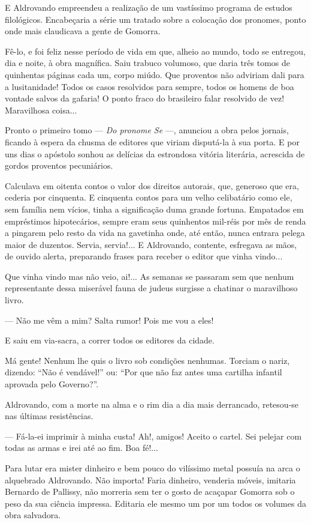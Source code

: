 E Aldrovando empreendeu a realização de um vastíssimo programa de
estudos filológicos. Encabeçaria a série um tratado sobre a colocação
dos pronomes, ponto onde mais claudicava a gente de Gomorra.

Fê-lo, e foi feliz nesse período de vida em que, alheio ao mundo, todo
se entregou, dia e noite, à obra magnífica. Saiu trabuco volumoso, que
daria três tomos de quinhentas páginas cada um, corpo miúdo. Que
proventos não adviriam dali para a lusitanidade! Todos os casos
resolvidos para sempre, todos os homens de boa vontade salvos da
gafaria! O ponto fraco do brasileiro falar resolvido de vez! Maravilhosa
coisa...

Pronto o primeiro tomo --- \emph{Do pronome Se} ---, anunciou a obra
pelos jornais, ficando à espera da chusma de editores que viriam
disputá-la à sua porta. E por uns dias o apóstolo sonhou as delícias da
estrondosa vitória literária, acrescida de gordos proventos pecuniários.

Calculava em oitenta contos o valor dos direitos autorais, que, generoso
que era, cederia por cinquenta. E cinquenta contos para um velho
celibatário como ele, sem família nem vícios, tinha a significação duma
grande fortuna. Empatados em empréstimos hipotecários, sempre eram seus
quinhentos mil-réis por mês de renda a pingarem pelo resto da vida na
gavetinha onde, até então, nunca entrara pelega maior de duzentos.
Servia, servia!... E Aldrovando, contente, esfregava as mãos, de ouvido
alerta, preparando frases para receber o editor que vinha vindo...

Que vinha vindo mas não veio, ai!... As semanas se passaram sem que
nenhum representante dessa miserável fauna de judeus surgisse a chatinar
o maravilhoso livro.

--- Não me vêm a mim? Salta rumor! Pois me vou a eles!

E saiu em via-sacra, a correr todos os editores da cidade.

Má gente! Nenhum lhe quis o livro sob condições nenhumas. Torciam o
nariz, dizendo: ``Não é vendável!'' ou: ``Por que não faz antes uma
cartilha infantil aprovada pelo Governo?''.

Aldrovando, com a morte na alma e o rim dia a dia mais derrancado,
retesou-se nas últimas resistências.

--- Fá-la-ei imprimir à minha custa! Ah!, amigos! Aceito o cartel. Sei
pelejar com todas as armas e irei até ao fim. Boa fé!...

Para lutar era mister dinheiro e bem pouco do vilíssimo metal possuía na
arca o alquebrado Aldrovando. Não importa! Faria dinheiro, venderia
móveis, imitaria Bernardo de Pallissy, não morreria sem ter o gosto de
acaçapar Gomorra sob o peso da sua ciência impressa. Editaria ele mesmo
um por um todos os volumes da obra salvadora.

